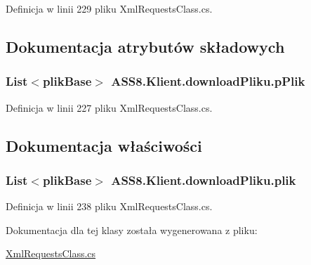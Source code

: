 Definicja w linii 229 pliku XmlRequestsClass.cs.

\subsection{Dokumentacja atrybutów składowych}
\hypertarget{a00002_2b7e420409cf7d906d6db326c9c877e6}{
\subsubsection[{pPlik}]{\setlength{\rightskip}{0pt plus 5cm}List$<${\bf plikBase}$>$ {\bf ASS8.Klient.downloadPliku.pPlik}}}
\label{d7/d46/a00002_2b7e420409cf7d906d6db326c9c877e6}




Definicja w linii 227 pliku XmlRequestsClass.cs.

\subsection{Dokumentacja właściwości}
\hypertarget{a00002_afc812455fda8104711ad7f8e2508a6b}{
\subsubsection[{plik}]{\setlength{\rightskip}{0pt plus 5cm}List$<${\bf plikBase}$>$ ASS8.Klient.downloadPliku.plik}}
\label{d7/d46/a00002_afc812455fda8104711ad7f8e2508a6b}




Definicja w linii 238 pliku XmlRequestsClass.cs.

Dokumentacja dla tej klasy została wygenerowana z pliku:\begin{CompactItemize}
\item 
\hyperlink{a00055}{XmlRequestsClass.cs}\end{CompactItemize}
